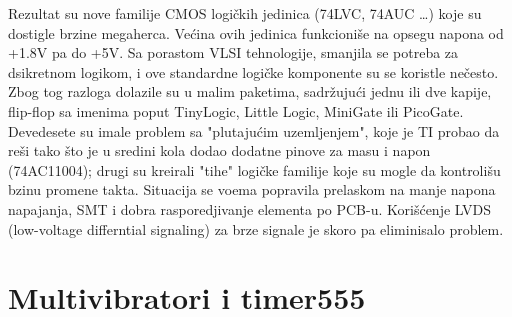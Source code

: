 \documentclass[12pt,a4paper]{article}
\begin{document}
Rezultat su nove familije CMOS logičkih jedinica (74LVC, 74AUC \dots) koje su dostigle brzine megaherca. 
Većina ovih jedinica funkcioniše na opsegu napona od +1.8V pa do +5V.
Sa porastom VLSI tehnologije, smanjila se potreba za dsikretnom logikom, i ove standardne logičke komponente su se koristle nečesto. Zbog tog razloga dolazile su u malim paketima, sadržujući jednu ili dve kapije, flip-flop sa imenima poput TinyLogic, Little Logic, MiniGate ili PicoGate.
Devedesete su imale problem sa "plutajućim uzemljenjem", koje je TI probao da reši tako što je u sredini kola dodao dodatne pinove za masu i napon (74AC11004); drugi su kreirali "tihe" logičke familije koje su mogle da kontrolišu bzinu promene takta. 
Situacija se voema popravila prelaskom na manje napona napajanja, SMT i dobra rasporedjivanje elementa po PCB-u. Korišćenje LVDS (low-voltage differntial signaling) za brze signale je skoro pa eliminisalo problem.
\newpage
\section{Multivibratori i timer555}
\end{document}
